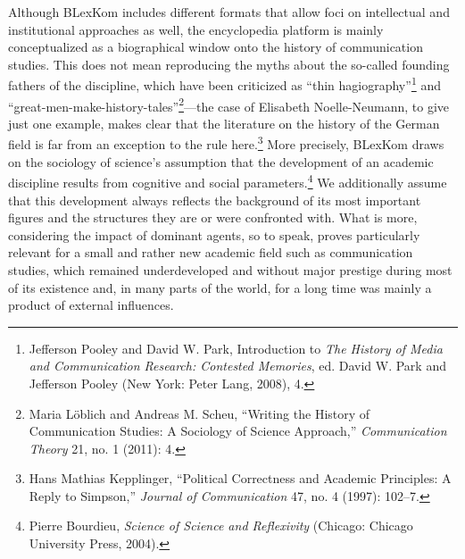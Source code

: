 \documentclass{tufte-handout}
\begin{document}
Although BLexKom includes different formats that allow foci on
intellectual and institutional approaches as well, the encyclopedia
platform is mainly conceptualized as a biographical window onto the
history of communication studies. This does not mean reproducing the
myths about the so-called founding fathers of the discipline, which have
been criticized as ``thin
hagiography''\footnote{Jefferson Pooley and David W. Park, Introduction to \emph{The History
  of Media and Communication Research: Contested Memories}, ed. David W.
  Park and Jefferson Pooley (New York: Peter Lang, 2008), 4.
} and
``great-men-make-history-tales''\footnote{Maria Löblich and Andreas M. Scheu, ``Writing the History of
  Communication Studies: A Sociology of Science Approach,''
  \emph{Communication Theory} 21, no. 1 (2011): 4.
}---the
case of Elisabeth Noelle-Neumann, to give just one example, makes clear
that the literature on the history of the German field is far from an
exception to the rule here.\footnote{Hans Mathias Kepplinger, ``Political Correctness and Academic
  Principles: A Reply to Simpson,'' \emph{Journal of Communication} 47,
  no. 4 (1997): 102--7.
} More
precisely, BLexKom draws on the sociology of science's assumption that
the development of an academic discipline results from cognitive and
social parameters.\footnote{Pierre Bourdieu, \emph{Science of Science and Reflexivity} (Chicago:
  Chicago University Press, 2004).
} We additionally
assume that this development always reflects the background of its most
important figures and the structures they are or were confronted with.
What is more, considering the impact of dominant agents, so to speak,
proves particularly relevant for a small and rather new academic field
such as communication studies, which remained underdeveloped and without
major prestige during most of its existence and, in many parts of the
world, for a long time was mainly a product of external influences.
\end{document}
